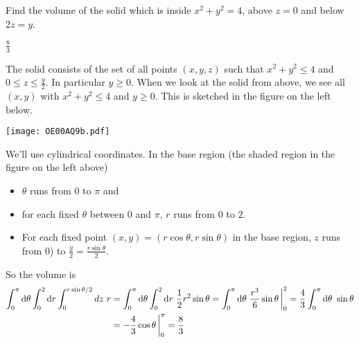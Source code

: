 \begin{question} [M200 2000A] %
Find the volume of the solid which is inside $x^2 + y^2 = 4$,
above $z = 0$ and below $2z = y$.
\end{question}

%

\begin{answer}
$\frac{8}{3}$
\end{answer}

\begin{solution}
The solid consists of the set of all points $(x,y,z)$ such
that $x^2+y^2\le 4$ and $0\le z\le\frac{y}{2}$. In particular $y\ge 0$.
When we look at the solid from above, we see all $(x,y)$ with
$x^2+y^2\le 4$ and $y\ge 0$. This is sketched in the figure on the left
below.
\begin{center}
     \qquad
     \texttt{[image: OE00AQ9b.pdf]}
\end{center}   
We'll use cylindrical coordinates. In the base region (the shaded region
in the figure on the left above)
\begin{itemize}
\item
$\theta$ runs from $0$ to $\pi$ and
\item
for each fixed $\theta$ between $0$ and $\pi$, $r$ runs from $0$ to $2$.
\item
For each fixed point $(x,y)=(r\cos\theta,r\sin\theta)$ in the base
region, $z$ runs from $0$) to $\frac{y}{2}=\frac{r\sin\theta}{2}$.
\end{itemize}
So the volume is
\begin{align*}
\int_0^\pi \mathrm{d}\theta\int_0^2 \mathrm{d}r\int_0^{r\sin\theta/2} dz\ r
&=\int_0^\pi \mathrm{d}\theta\int_0^2 \mathrm{d}r\ \frac{1}{2} r^2\sin\theta
=\int_0^\pi \mathrm{d}\theta\ \frac{r^3}{6}\sin\theta\,\bigg|_0^2
=\frac{4}{3}\int_0^\pi \mathrm{d}\theta\ \sin\theta \\
&=-\frac{4}{3}\cos\theta\,\bigg|_0^\pi
=\frac{8}{3}
\end{align*}
\end{solution}





\subsection*{\Application}

